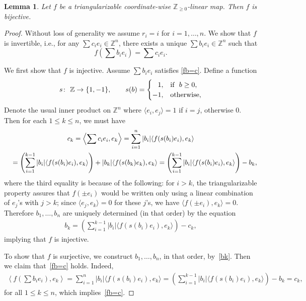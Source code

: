 \documentclass[pdftex]{sigma}
\numberwithin{equation}{section}
\newtheorem{Lemma}[Theorem]{Lemma}
\begin{document}
\begin{Lemma}\label{lem:triangularizable bijective}
Let $f$ be a triangularizable coordinate-wise $\mathbb{Z}_{\ge0}$-linear map. Then $f$ is bijective.
\end{Lemma}

\begin{proof}
Without loss of generality we assume $r_i=i$ for $i=1,\dots,n$. We show that $f$ is invertible, i.e., for any $\sum c_ie_i\in\mathbb{Z}^n$,  there exists a unique $\sum b_ie_i\in\mathbb{Z}^n$ such that
\begin{equation}\label{fb=c}
f\left(\sum b_ie_i\right)=\sum c_ie_i.
\end{equation}

We f\/irst show that $f$ is injective. Assume $\sum b_ie_i$ satisf\/ies \eqref{fb=c}. Def\/ine a function
\begin{gather*}
s\colon \ \mathbb{Z}\to\{1,-1\}, \qquad  s(b)=
\begin{cases} \hphantom{-}1,&  \text{if} \ \ b\ge0,\\
  -1, & \text{otherwise},
\end{cases}
\end{gather*}
Denote the usual inner product on $\mathbb{Z}^n$ where $\langle e_i,e_j\rangle=1$ if $i=j$, otherwise $0$. Then for each $1\le k\le n$, we must have
\begin{gather*}
c_k =\left\langle\sum c_ie_i,e_k\right\rangle=\sum_{i=1}^{n}|b_i| \langle f(s(b_i) e_i),e_k\rangle
\\
\hphantom{c_k}{}
=\left(\sum_{i=1}^{k-1}|b_i| \langle f(s(b_i) e_i),e_k\rangle\right)+|b_k|\langle f(s(b_k) e_k),e_k\rangle=\left(\sum_{i=1}^{k-1}|b_i| \langle f(s(b_i) e_i),e_k\rangle\right)-b_k,
\end{gather*}
where the third equality is because of the following: for $i>k$, the triangularizable property assures that $f(\pm e_i)$ would be written only using a linear combination of $e_j$'s with $j>k$; since $\langle e_j,e_k\rangle=0$ for these $j$'s, we have $\langle f(\pm e_i),e_k\rangle=0$.
Therefore $b_1,\dots,b_n$ are uniquely determined (in that order) by the equation
\begin{gather}\label{bk}
b_k=\left(\sum_{i=1}^{k-1}|b_i| \langle f(s(b_i) e_i),e_k\rangle\right)-c_k,
\end{gather}
 implying that $f$ is injective.

To show that $f$ is surjective, we construct $b_1,\dots,b_n$, in that order, by~\eqref{bk}. Then we claim that~\eqref{fb=c} holds. Indeed,
\begin{gather*}
\left\langle f\left(\sum b_ie_i\right),e_k\right\rangle=\sum_{i=1}^n |b_i|\langle f(s(b_i) e_i),e_k\rangle=\left(\sum_{i=1}^{k-1}|b_i| \langle f(s(b_i) e_i),e_k\rangle\right)-b_k=c_k,
\end{gather*}
for all $1\le k\le n$, which implies~\eqref{fb=c}.
\end{proof}
\end{document}
